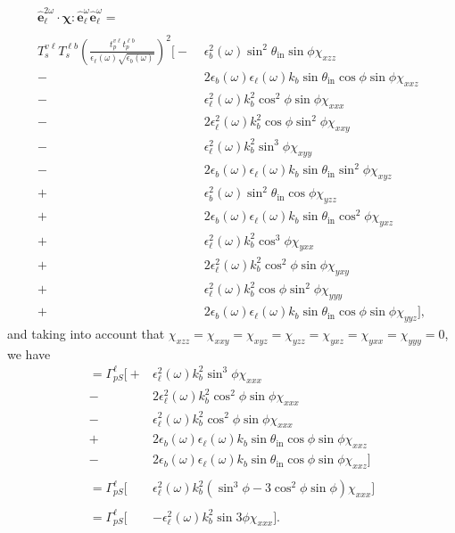 \begin{equation*}
\begin{split}
\hat{\mathbf{e}}^{2\omega}_{\ell}
\cdot\boldsymbol{\chi}:
\hat{\mathbf{e}}^{\omega}_{\ell}\hat{\mathbf{e}}^{\omega}_{\ell} =
\qquad\qquad\qquad&\\\\
T^{v\ell}_{s}T^{\ell b}_{s}\left(\frac{t^{v\ell}_{p}t^{\ell b}_{p}}
      {\epsilon_{\ell}(\omega)\sqrt{\epsilon_{b}(\omega)}}\right)^{2}
\big[
- &\epsilon_{b}^{2}(\omega)\sin^{2}\theta_{\mathrm{in}}\sin\phi\chi_{xzz}\\
-&2\epsilon_{b}(\omega)\epsilon_{\ell}(\omega)k_{b}\sin\theta_{\mathrm{in}}
   \cos\phi\sin\phi\chi_{xxz}\\
- &\epsilon^{2}_{\ell}(\omega)k^{2}_{b}\cos^{2}\phi\sin\phi\chi_{xxx}\\
-&2\epsilon^{2}_{\ell}(\omega)k^{2}_{b}\cos\phi\sin^{2}\phi\chi_{xxy}\\
- &\epsilon^{2}_{\ell}(\omega)k^{2}_{b}\sin^{3}\phi\chi_{xyy}\\
-&2\epsilon_{b}(\omega)\epsilon_{\ell}(\omega)k_{b}\sin\theta_{\mathrm{in}}
   \sin^{2}\phi\chi_{xyz}\\
+ &\epsilon_{b}^{2}(\omega)\sin^{2}\theta_{\mathrm{in}}\cos\phi\chi_{yzz}\\
+&2\epsilon_{b}(\omega)\epsilon_{\ell}(\omega)k_{b}\sin\theta_{\mathrm{in}}
   \cos^{2}\phi\chi_{yxz}\\
+ &\epsilon^{2}_{\ell}(\omega)k^{2}_{b}\cos^{3}\phi\chi_{yxx}\\
+&2\epsilon^{2}_{\ell}(\omega)k^{2}_{b}\cos^{2}\phi\sin\phi\chi_{yxy}\\
+ &\epsilon^{2}_{\ell}(\omega)k^{2}_{b}\cos\phi\sin^{2}\phi\chi_{yyy}\\
+&2\epsilon_{b}(\omega)\epsilon_{\ell}(\omega)k_{b}\sin\theta_{\mathrm{in}}
   \cos\phi\sin\phi\chi_{yyz}
\big],
\end{split}
\end{equation*}
and taking into account that $\chi_{xzz} = \chi_{xxy} = \chi_{xyz} = \chi_{yzz}
= \chi_{yxz} = \chi_{yxx} = \chi_{yyy} = 0$, we have
\begin{equation*}
\begin{split}
= \Gamma^{\ell}_{pS}
\big[
+ &\epsilon^{2}_{\ell}(\omega)k^{2}_{b}\sin^{3}\phi\chi_{xxx}\\
-&2\epsilon^{2}_{\ell}(\omega)k^{2}_{b}\cos^{2}\phi\sin\phi\chi_{xxx}\\
- &\epsilon^{2}_{\ell}(\omega)k^{2}_{b}\cos^{2}\phi\sin\phi\chi_{xxx}\\
+&2\epsilon_{b}(\omega)\epsilon_{\ell}(\omega)k_{b}\sin\theta_{\mathrm{in}}
   \cos\phi\sin\phi\chi_{xxz}\\
-&2\epsilon_{b}(\omega)\epsilon_{\ell}(\omega)k_{b}\sin\theta_{\mathrm{in}}
   \cos\phi\sin\phi\chi_{xxz}
\big]\\\\
= \Gamma^{\ell}_{pS}
\big[
&\epsilon^{2}_{\ell}(\omega)k^{2}_{b}
(\sin^{3}\phi - 3\cos^{2}\phi\sin\phi)\chi_{xxx}
\big]\\\\
= \Gamma^{\ell}_{pS}
\big[
&-\epsilon^{2}_{\ell}(\omega)k^{2}_{b}
\sin3\phi\chi_{xxx}
\big].
\end{split}
\end{equation*}
